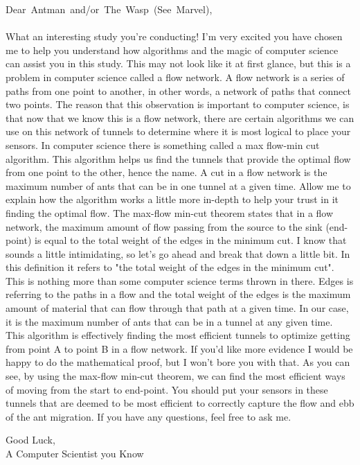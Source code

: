 \documentclass[12pt]{article}
\begin{document}
\newpage
\mbox{Dear Antman and/or The Wasp (See Marvel),}
\\ \\What an interesting study you're conducting! I'm very excited you have chosen me to help you understand how algorithms and the magic of computer science can assist you in this study. This may not look like it at first glance, but this is a problem in computer science called a flow network. A flow network is a series of paths from one point to another, in other words, a network of paths that connect two points. The reason that this observation is important to computer science, is that now that we know this is a flow network, there are certain algorithms we can use on this network of tunnels to determine where it is most logical to place your sensors. In computer science there is something called a max flow-min cut algorithm. This algorithm helps us find the tunnels that provide the optimal flow from one point to the other, hence the name. A cut in a flow network is the maximum number of ants that can be in one tunnel at a given time. Allow me to explain how the algorithm works a little more in-depth to help your trust in it finding the optimal flow. The max-flow min-cut theorem states that in a flow network, the maximum amount of flow passing from the source to the sink (end-point) is equal to the total weight of the edges in the minimum cut. I know that sounds a little intimidating, so let's go ahead and break that down a little bit. In this definition it refers to "the total weight of the edges in the minimum cut". This is nothing more than some computer science terms thrown in there. Edges is referring to the paths in a flow and the total weight of the edges is the maximum amount of material that can flow through that path at a given time. In our case, it is the maximum number of ants that can be in a tunnel at any given time. This algorithm is effectively finding the most efficient tunnels to optimize getting from point A to point B in a flow network. If you'd like more evidence I would be happy to do the mathematical proof, but I won't bore you with that. As you can see, by using the max-flow min-cut theorem, we can find the most efficient ways of moving from the start to end-point. You should put your sensors in these tunnels that are deemed to be most efficient to correctly capture the flow and ebb of the ant migration. If you have any questions, feel free to ask me.

Good Luck,
\\A Computer Scientist you Know 

\newpage
\pagebreak
\end{document}
